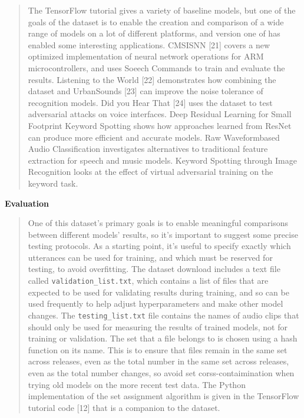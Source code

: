 \documentclass{article}
\theoremstyle{definition}
\theoremstyle{remark}
\begin{document}
\begin{quote}
The TensorFlow tutorial gives a variety of baseline models, but one of the goals of the dataset is to enable the creation and comparison of a wide range of models on a lot of different platforms, and version one of has enabled some interesting applications. CMSISNN [21] covers a new optimized implementation of neural network operations for ARM microcontrollers, and uses Soeech Commands to train and evaluate the results. Listening to the World [22] demonstrates how combining the dataset and UrbanSounds [23] can improve the noise tolerance of recognition models. Did you Hear That [24] uses the dataset to test adversarial attacks on voice interfaces. Deep Residual Learning for Small Footprint Keyword Spotting \cite{tang2018deep} shows how approaches learned from ResNet can produce more efficient and accurate models. Raw Waveformbased Audio Classification \cite{lee2017raw} investigates alternatives to traditional feature extraction for speech and music models. Keyword Spotting through Image Recognition \cite{gouda2018speech} looks at the effect of virtual adversarial training on the keyword task.
\end{quote}

\textbf{Evaluation}

\begin{quote}
One of this dataset's primary goals is to enable meaningful comparisons between different models' results, so it's important to suggest some precise testing protocols. As a starting point, it's useful to specify exactly which utterances can be used for training, and which must be reserved for testing, to avoid overfitting. The dataset download includes a text file called \texttt{validation\_list.txt}, which contains a list of files that are expected to be used for validating results during training, and so can be used frequently to help adjust hyperparameters and make other model changes. The \texttt{testing\_list.txt} file contains the names of audio clips that should only be used for measuring the results of trained models, not for training or validation. The set that a file belongs to is chosen using a hash function on its name. This is to ensure that files remain in the same set across releases, even as the total number in the same set across releases, even as the total number changes, so avoid set corss-contaimination when trying old models on the more recent test data. The Python implementation of the set assignment algorithm is given in the TensorFlow tutorial code [12] that is a companion to the dataset.
\end{quote}
\end{document}
